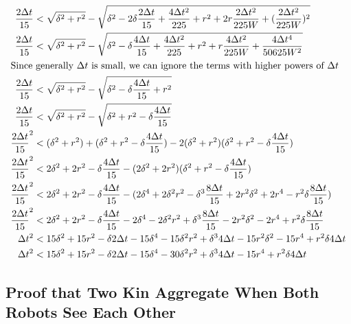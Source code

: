 \documentclass[conference]{IEEEtran}
\begin{document}
{\begin{align*}
        \frac{2\Delta t}{15} &< \sqrt{\delta^2 + r^2}-\sqrt{\delta^2-2\delta\frac{2\Delta t}{15}+\frac{4\Delta t^2}{225}+r^2+2r\frac{2\Delta t^2}{225W}+(\frac{2\Delta t^2}{225W})^2} \\
        \frac{2\Delta t}{15} &< \sqrt{\delta^2 + r^2}-\sqrt{\delta^2-\delta\frac{4\Delta t}{15}+\frac{4\Delta t^2}{225}+r^2+r\frac{4\Delta t^2}{225W}+\frac{4\Delta t^4}{50625W^2}} \\
        \intertext{Since generally $\Delta t$ is small, we can ignore the terms with higher powers of $\Delta t$}
        \frac{2\Delta t}{15} &< \sqrt{\delta^2 + r^2}-\sqrt{\delta^2-\delta\frac{4\Delta t}{15}+r^2} \\
        \frac{2\Delta t}{15} &< \sqrt{\delta^2 + r^2}-\sqrt{\delta^2+r^2-\delta\frac{4\Delta t}{15}} \\
        \frac{2\Delta t}{15}^2 &< (\delta^2 + r^2)+(\delta^2+r^2-\delta\frac{4\Delta t}{15}) - 2(\delta^2 + r^2)(\delta^2+r^2-\delta\frac{4\Delta t}{15}) \\
        \frac{2\Delta t}{15}^2 &< 2\delta^2 + 2r^2-\delta\frac{4\Delta t}{15} - (2\delta^2 + 2r^2)(\delta^2+r^2-\delta\frac{4\Delta t}{15}) \\
        \frac{2\Delta t}{15}^2 &< 2\delta^2 + 2r^2-\delta\frac{4\Delta t}{15} - (2\delta^4 + 2\delta^2r^2-\delta^3\frac{8\Delta t}{15} + 2r^2\delta^2 + 2r^4 - r^2\delta\frac{8\Delta t}{15}) \\
        \frac{2\Delta t}{15}^2 &< 2\delta^2 + 2r^2-\delta\frac{4\Delta t}{15} - 2\delta^4 - 2\delta^2r^2+\delta^3\frac{8\Delta t}{15} - 2r^2\delta^2 - 2r^4 + r^2\delta\frac{8\Delta t}{15} \\
        \Delta t^2 &< 15\delta^2 + 15r^2 - \delta2\Delta t - 15\delta^4 - 15\delta^2r^2 + \delta^34\Delta t - 15r^2\delta^2 - 15r^4 + r^2\delta4\Delta t \\
        \Delta t^2 &< 15\delta^2 + 15r^2 - \delta2\Delta t - 15\delta^4 - 30\delta^2r^2 + \delta^34\Delta t - 15r^4 + r^2\delta4\Delta t \\
      \end{align*}
    }

  \subsection{Proof that Two Kin Aggregate When Both Robots See Each Other} \label{thm:two_agg_2}
\end{document}
